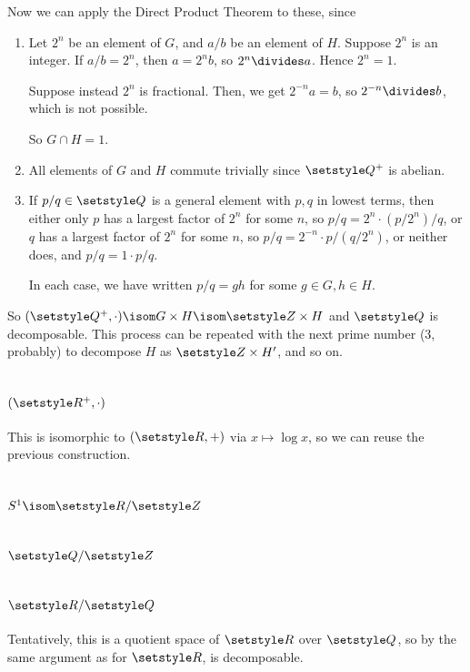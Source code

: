 \documentclass[fleqn,a4paper,11pt]{article}
\begin{document}
Now we can apply the Direct Product Theorem to these, since
\begin{enumerate}[label=(\roman*)]
 \item
  Let \(2^n\) be an element of \(G\), and \(a/b\) be an element of \(H\).
  Suppose \(2^n\) is an integer.
  If \(a/b = 2^n\), then \(a = 2^n b\), so \(2^n \divides a\). Hence \(2^n = 1\).

  Suppose instead \(2^n\) is fractional. Then, we get
  \(2^{-n} a = b\), so \(2^{-n} \divides b\), which is not possible.

  So \(G \cap H = {1}\).
 \item
  All elements of \(G\) and \(H\) commute trivially since \(\Rationals^+\) is
  abelian.
 \item
  If \(p/q \in \Rationals\) is a general element with \(p, q\) in lowest terms,
  then either only \(p\) has a largest factor of \(2^n\) for some \(n\), so
  \(p/q = 2^n \cdot (p/2^n)/q\), or
  \(q\) has a largest factor of \(2^n\) for some \(n\), so
  \(p/q = 2^{-n} \cdot p/(q/2^n)\), or neither does, and
  \(p/q = 1 \cdot p/q\).

  In each case, we have written \(p/q = gh\) for some \(g \in G, h \in H\).
\end{enumerate}
So \((\Rationals^+, \cdot) \isom G \times H \isom \Integers \times H\) and
\(\Rationals\) is decomposable. This process can be repeated with the next prime
number (\(3\), probably) to decompose \(H\) as \(\Integers \times H'\), and so
on.

\section{\((\Reals^+, \cdot)\)}

This is isomorphic to \((\Reals, +)\) via \(x \mapsto \log x\), so we can reuse
the previous construction.

\section{\(S^1 \isom \Reals / \Integers\)}

\section{\(\Rationals / \Integers\)}

\section{\(\Reals / \Rationals\)}

Tentatively, this is a quotient space of \(\Reals\) over \(\Rationals\), so by
the same argument as for \(\Reals\), is decomposable.
\end{document}

